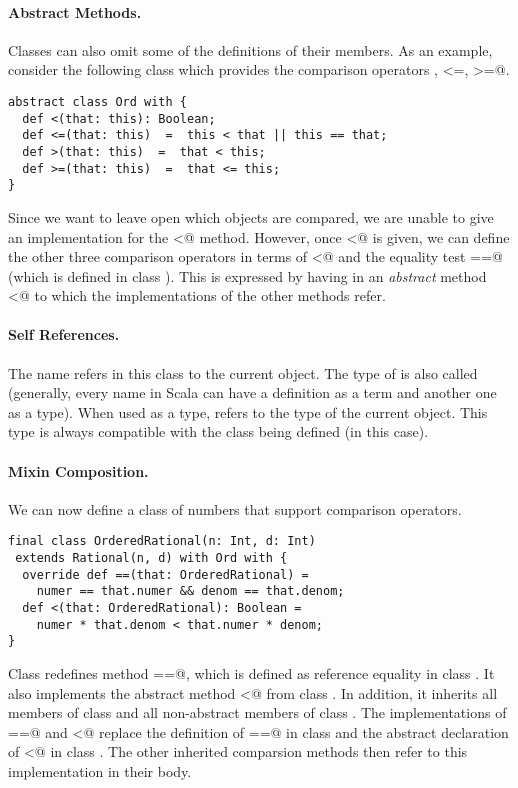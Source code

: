 \documentclass[11pt]{report}
\begin{document}
\paragraph{Abstract Methods.}
Classes can also omit some of the definitions of their members.  As an
example, consider the following class \verb@Ord@ which provides the
comparison operators \verb@<, >, <=, >=@.
\begin{verbatim}
abstract class Ord with {
  def <(that: this): Boolean;
  def <=(that: this)  =  this < that || this == that;
  def >(that: this)  =  that < this;
  def >=(that: this)  =  that <= this;
}
\end{verbatim}
Since we want to leave open which objects are compared, we are unable
to give an implementation for the \verb@<@ method. However, once
\verb@<@ is given, we can define the other three comparison operators
in terms of \verb@<@ and the equality test \verb@==@ (which is defined
in class \verb@Object@).  This is expressed by having in \verb@Ord@ an
{\em abstract} method \verb@<@ to which the implementations of the
other methods refer.

\paragraph{Self References.} The name \verb@this@ refers in this class
to the current object. The type of \verb@this@ is also called
\verb@this@ (generally, every name in Scala can have a definition as a
term and another one as a type).  When used as a type, \verb@this@
refers to the type of the current object. This type is always
compatible with the class being defined (\verb@Ord@ in this case).

\paragraph{Mixin Composition.}
We can now define a class of \verb@Rational@ numbers that
support comparison operators.
\begin{verbatim}
final class OrderedRational(n: Int, d: Int)
 extends Rational(n, d) with Ord with {
  override def ==(that: OrderedRational) =
    numer == that.numer && denom == that.denom;
  def <(that: OrderedRational): Boolean =
    numer * that.denom < that.numer * denom;
}
\end{verbatim}
Class \verb@OrderedRational@ redefines method \verb@==@, which is
defined as reference equality in class \verb@Object@. It also
implements the abstract method \verb@<@ from class \verb@Ord@.  In
addition, it inherits all members of class \verb@Rational@ and all
non-abstract members of class \verb@Ord@. The implementations of
\verb@==@ and \verb@<@ replace the definition of \verb@==@ in class
\verb@Object@ and the abstract declaration of \verb@<@ in class
\verb@Ord@. The other inherited comparsion methods then refer to this
implementation in their body.
\end{document}
